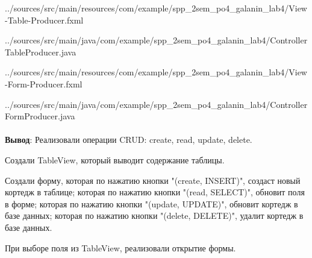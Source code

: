 \documentclass[12pt, a4paper, simple]{eskdtext}
\begin{document}
   
    
    {../sources/src/main/resources/com/example/spp_2sem_po4_galanin_lab4/View-Table-Producer.fxml}

    
    {../sources/src/main/java/com/example/spp_2sem_po4_galanin_lab4/ControllerTableProducer.java}


    
    {../sources/src/main/resources/com/example/spp_2sem_po4_galanin_lab4/View-Form-Producer.fxml}

    
    {../sources/src/main/java/com/example/spp_2sem_po4_galanin_lab4/ControllerFormProducer.java}


    \paragraph{} \textbf{Вывод}:
    Реализовали операции CRUD: create, read, update, delete.

    Создали TableView, который выводит содержание таблицы.

    Создали форму,
    которая по нажатию кнопки "(create, INSERT)",
    создаст новый кортедж в таблице;
    которая по нажатию кнопки "(read, SELECT)",
    обновит поля в форме;
    которая по нажатию кнопки "(update, UPDATE)",
    обновит кортедж в базе данных;
    которая по нажатию кнопки "(delete, DELETE)",
    удалит кортедж в базе данных.

    При выборе поля из TableView, реализовали открытие формы.

    \newpage
\end{document}
